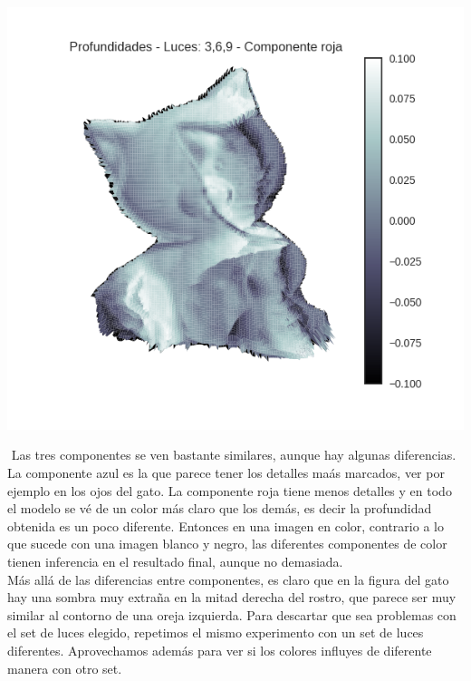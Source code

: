{\centering
  \includegraphics[width=0.5\linewidth]{informe/imagenes/profundidades/gato369Rojo.png}
}

$ $\newline
Las tres componentes se ven bastante similares, aunque hay algunas diferencias. La componente azul es la que parece tener los detalles maás marcados, ver por ejemplo en los ojos del gato. La componente roja tiene menos detalles y en todo el modelo se vé de un color más claro que los demás, es decir la profundidad obtenida es un poco diferente. Entonces en una imagen en color, contrario a lo que sucede con una imagen blanco y negro, las diferentes componentes de color tienen inferencia en el resultado final, aunque no demasiada. \\

Más allá de las diferencias entre componentes, es claro que en la figura del gato hay una sombra muy extraña en la mitad derecha del rostro, que parece ser muy similar al contorno de una oreja izquierda. Para descartar que sea problemas con el set de luces elegido, repetimos el mismo experimento con un set de luces diferentes. Aprovechamos además para ver si los colores influyes de diferente manera con otro set. \\

